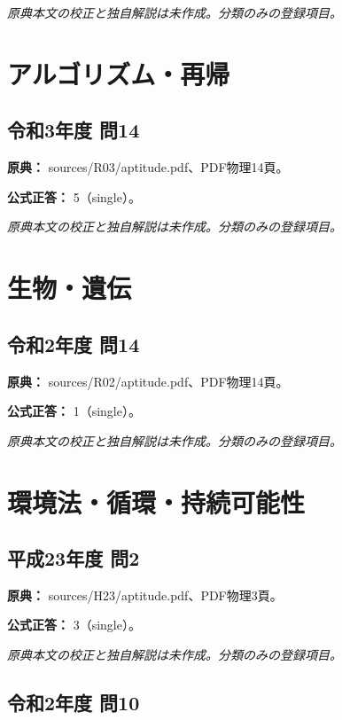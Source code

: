 \par\textit{原典本文の校正と独自解説は未作成。分類のみの登録項目。}

\section{アルゴリズム・再帰}

\subsection{令和3年度 問14}
\label{q:r03-reg-apt-14}

\noindent\textbf{原典：} sources/R03/aptitude.pdf、PDF物理14頁。

\textbf{公式正答：} 5（single）。

\par\textit{原典本文の校正と独自解説は未作成。分類のみの登録項目。}

\section{生物・遺伝}

\subsection{令和2年度 問14}
\label{q:r02-reg-apt-14}

\noindent\textbf{原典：} sources/R02/aptitude.pdf、PDF物理14頁。

\textbf{公式正答：} 1（single）。

\par\textit{原典本文の校正と独自解説は未作成。分類のみの登録項目。}

\section{環境法・循環・持続可能性}

\subsection{平成23年度 問2}
\label{q:h23-reg-apt-02}

\noindent\textbf{原典：} sources/H23/aptitude.pdf、PDF物理3頁。

\textbf{公式正答：} 3（single）。

\par\textit{原典本文の校正と独自解説は未作成。分類のみの登録項目。}

\subsection{令和2年度 問10}
\label{q:r02-reg-apt-10}

